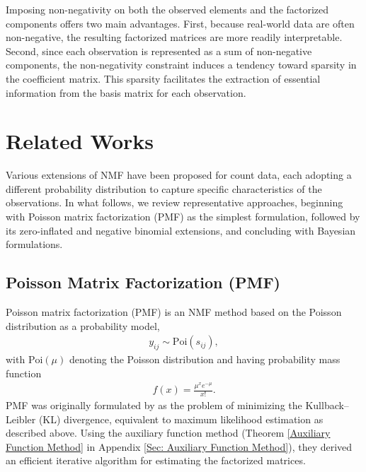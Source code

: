 \documentclass[pdflatex,sn-basic]{sn-jnl}%
\theoremstyle{thmstyleone}%
\theoremstyle{thmstyletwo}%
\theoremstyle{thmstylethree}%
\begin{document}
Imposing non-negativity on both the observed elements and the factorized components offers two main advantages.  
First, because real-world data are often non-negative, the resulting factorized matrices are more readily interpretable.  
Second, since each observation is represented as a sum of non-negative components, the non-negativity constraint induces a tendency toward sparsity in the coefficient matrix.  
This sparsity facilitates the extraction of essential information from the basis matrix for each observation.


\section{Related Works}\label{Sec: Related Works}
Various extensions of NMF have been proposed for count data, each adopting a different probability distribution to capture specific characteristics of the observations.  
In what follows, we review representative approaches, beginning with Poisson matrix factorization (PMF) as the simplest formulation, followed by its zero-inflated and negative binomial extensions, and concluding with Bayesian formulations.


\subsection{Poisson Matrix Factorization (PMF)}
Poisson matrix factorization (PMF) is an NMF method based on the Poisson distribution as a probability model,
\begin{align*}
	y_{ij} \sim \mathrm{Poi}(s_{ij}),
\end{align*}
with $\mathrm{Poi}(\mu)$ denoting the Poisson distribution and having probability mass function
\begin{align*}
	f(x) = \frac{\mu^{x} e^{-\mu}}{x!}. \label{eq: pmf of Poisson}
\end{align*}
PMF was originally formulated by \citet{Lee1999} as the problem of minimizing the Kullback–Leibler (KL) divergence, equivalent to maximum likelihood estimation as described above.  
Using the auxiliary function method (Theorem \ref{Auxiliary Function Method} in Appendix \ref{Sec: Auxiliary Function Method}), they derived an efficient iterative algorithm for estimating the factorized matrices.
\end{document}

